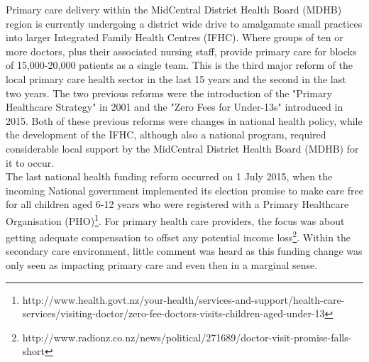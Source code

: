 \documentclass[11pt,a4paper]{article}
\begin{document}
Primary care delivery within the MidCentral District Health Board (MDHB) region is currently undergoing a district wide drive to amalgamate small practices into larger Integrated Family Health Centres (IFHC). Where groups of ten or more doctors, plus their associated nursing staff, provide primary care for blocks of  15,000-20,000 patients as a single team. This is the third major reform of the local primary care health sector in the last 15 years and the second in the last two years. The two previous reforms were the introduction of the "Primary Healthcare Strategy" in 2001 and the "Zero Fees for Under-13s" introduced in 2015. Both of these previous reforms were changes in national health policy, while the development of the IFHC, although also a national program, required considerable local support by the MidCentral District Health Board (MDHB) for it to occur. \\


The last national health funding reform occurred on 1 July 2015, when the incoming National government implemented its election promise to make care free for all children aged 6-12 years who were registered with a Primary Healthcare Organisation (PHO)\footnote{http://www.health.govt.nz/your-health/services-and-support/health-care-services/visiting-doctor/zero-fee-doctors-visits-children-aged-under-13}. For primary health care providers, the focus was about getting adequate compensation to offset any potential income loss\footnote{http://www.radionz.co.nz/news/political/271689/doctor-visit-promise-falls-short}. Within the secondary care environment, little comment was heard as this funding change was only seen as impacting primary care and even then in a marginal sense.\\
\end{document}

